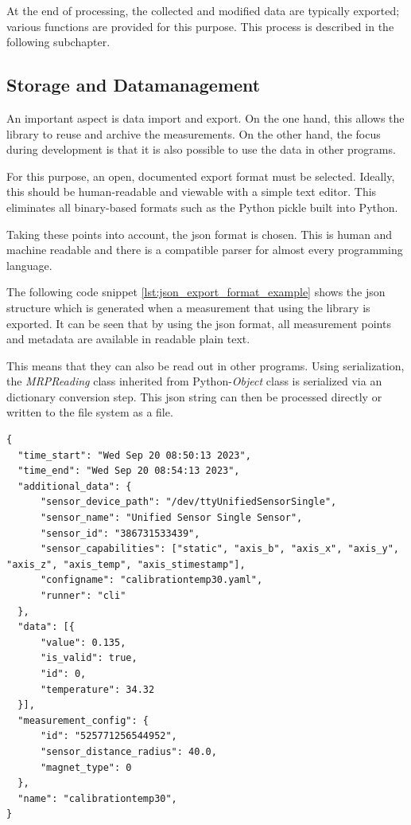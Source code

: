 At the end of processing, the collected and modified data are typically
exported; various functions are provided for this purpose. This process
is described in the following subchapter.

\hypertarget{storage-and-datamanagement}{%
\subsection{Storage and
Datamanagement}\label{storage-and-datamanagement}}

An important aspect is data import and export. On the one hand, this
allows the library to reuse and archive the measurements. On the other
hand, the focus during development is that it is also possible to use
the data in other programs.

For this purpose, an open, documented export format must be selected.
Ideally, this should be human-readable and viewable with a simple text
editor. This eliminates all binary-based formats such as the Python
pickle built into Python.

Taking these points into account, the \gls{json} format is chosen. This
is human and machine readable and there is a compatible parser for
almost every programming language.

The following code snippet \ref{lst:json_export_format_example} shows
the \gls{json} structure which is generated when a measurement that
using the library is exported. It can be seen that by using the
\gls{json} format, all measurement points and metadata are available in
readable plain text.

This means that they can also be read out in other programs. Using
serialization, the \emph{MRPReading} class inherited from
Python-\emph{Object} class is serialized via an dictionary conversion
step. This \gls{json} string can then be processed directly or written
to the file system as a file.

\begin{lstlisting}[caption={JSON export structure of an MRPReading based measurement}, label=lst:json_export_format_example]
{
  "time_start": "Wed Sep 20 08:50:13 2023",
  "time_end": "Wed Sep 20 08:54:13 2023",
  "additional_data": {
      "sensor_device_path": "/dev/ttyUnifiedSensorSingle",
      "sensor_name": "Unified Sensor Single Sensor",
      "sensor_id": "386731533439",
      "sensor_capabilities": ["static", "axis_b", "axis_x", "axis_y", "axis_z", "axis_temp", "axis_stimestamp"],
      "configname": "calibrationtemp30.yaml",
      "runner": "cli"
  },
  "data": [{
      "value": 0.135,
      "is_valid": true,
      "id": 0,
      "temperature": 34.32
  }],
  "measurement_config": {
      "id": "525771256544952",
      "sensor_distance_radius": 40.0,
      "magnet_type": 0
  },
  "name": "calibrationtemp30",
}
\end{lstlisting}

